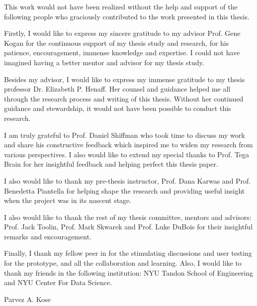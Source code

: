 %
%
%
%
%

\begin{acknowledgments} 

This work would not have been realized without the help and support of the following people who graciously contributed to the work presented in this thesis.

Firstly, I would like to express my sincere gratitude to my advisor Prof. Gene Kogan for the continuous support of my thesis study and research, for his patience, encouragement, immense knowledge and expertise. I could not have imagined having a better mentor and advisor for my thesis study.

Besides my advisor, I would like to express my immense gratitude to my thesis professor Dr. Elizabeth P. Henaff. Her counsel and guidance helped me all through the research process and writing of this thesis. Without her continued guidance and stewardship, it would not have been possible to conduct this research.

I am truly grateful to Prof. Daniel Shiffman who took time to discuss my work and share his constructive feedback which inspired me to widen my research from various perspectives. I also would like to extend my special thanks to Prof. Tega Brain for her insightful feedback and helping perfect this thesis paper.

I also would like to thank my pre-thesis instructor, Prof. Dana Karwas and Prof. Benedetta Piantella for helping shape the research and providing useful insight when the project was in its nascent stage.

I also would like to thank the rest of my thesis committee, mentors and advisors: Prof. Jack Toolin, Prof. Mark Skwarek and Prof. Luke DuBois for their insightful remarks and encouragement.

Finally, I thank my fellow peer in for the stimulating discussions and user testing for the prototype, and all the collaboration and learning. Also, I would like to thank my friends in the following institution: NYU Tandon School of Engineering and NYU Center For Data Science. %

\vspace*{-1em}
\begin{flushright} 
Parvez A. Kose
\end{flushright}
\end{acknowledgments}


